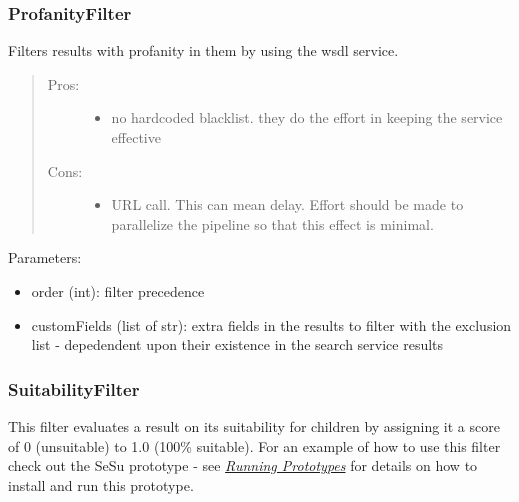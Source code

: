 \documentclass[letterpaper,10pt,english]{sphinxmanual}
\begin{document}
\subsubsection{ProfanityFilter}
\label{api2.0:profanityfilter}

\begin{fulllineitems}
\label{api2.0:puppy.result.filter.WdylProfanityFilter}
Filters results with profanity in them by using the wsdl service.
\begin{quote}
\begin{description}
\item[{Pros:}] \leavevmode\begin{itemize}
\item {} 
no hardcoded blacklist. they do the effort in keeping the service
effective

\end{itemize}

\item[{Cons:}] \leavevmode\begin{itemize}
\item {} 
URL call. This can mean delay. Effort should be made to parallelize the
pipeline so that this effect is minimal.

\end{itemize}

\end{description}
\end{quote}

Parameters:
\begin{itemize}
\item {} 
order (int): filter precedence

\item {} 
customFields (list of str): extra fields in the results to filter with the
exclusion list - depedendent upon their existence in the search service
results

\end{itemize}

\end{fulllineitems}



\subsubsection{SuitabilityFilter}
\label{api2.0:suitabilityfilter}
This filter evaluates a result on its suitability for children by assigning it a score of 0 (unsuitable) to 1.0 (100\% suitable). For an example of how to use this filter check out the SeSu prototype - see {\hyperref[prototypes:prototypes]{\emph{Running Prototypes}}} for details on how to install and run this prototype.
\end{document}
